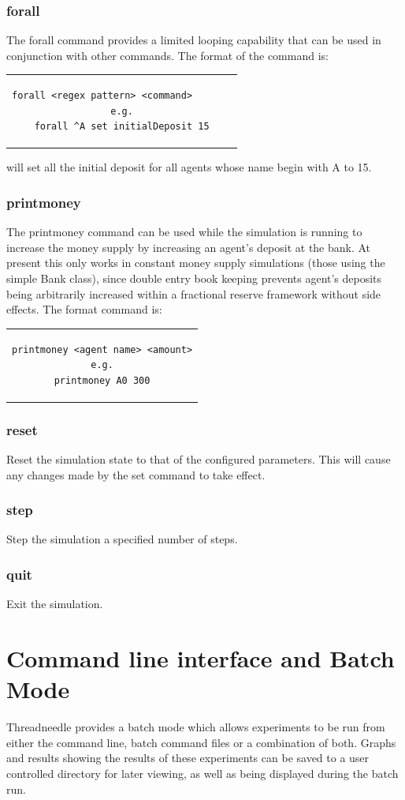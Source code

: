 \documentclass[10pt,oneside,openright, a4paper]{memoir}
\begin{document}
\subsubsection{forall}
The forall command provides a limited looping capability that
can be used in conjunction with other commands. The format
of the command is:
\begin{center}
\begin{tabular}{c}
\begin{lstlisting}
forall <regex pattern> <command>       
e.g.
forall ^A set initialDeposit 15
\end{lstlisting}
\end{tabular}
\end{center}
will set all the initial deposit for all agents whose name begin
with A to 15. 
\subsubsection{printmoney}
The printmoney command can be used while the simulation is running
to increase the money supply by increasing an agent's deposit
at the bank. At present this only works in constant money 
supply simulations (those using the simple Bank class), since
double entry book keeping prevents agent's deposits being
arbitrarily increased within a fractional reserve framework
without side effects.  The format command is:
\begin{center}
\begin{tabular}{c}
\begin{lstlisting}
printmoney <agent name> <amount>
e.g.
printmoney A0 300
\end{lstlisting}
\end{tabular}
\end{center}
\subsubsection{reset}
Reset the simulation state to that of the configured parameters.
This will cause any changes made by the set command to take
effect.
\subsubsection{step}
Step the simulation a specified number of steps.
\subsubsection{quit}
Exit the simulation.
\section{Command line interface and Batch Mode}   
Threadneedle provides a batch mode which allows
experiments to be run from either the command line, batch command files or
a combination of both. Graphs 
and results showing the results of these experiments can be saved to a 
user controlled directory for later viewing, as well as being displayed
during the batch run.
\end{document}
